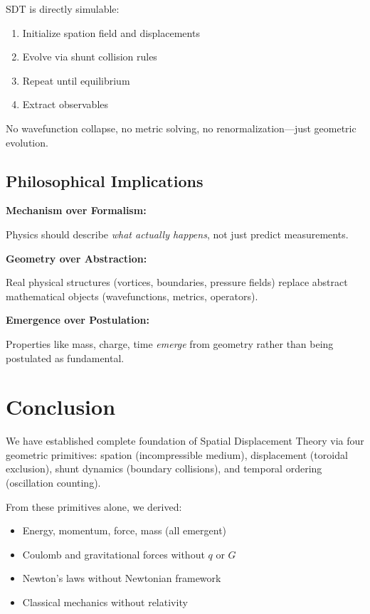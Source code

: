 SDT is directly simulable:

\begin{enumerate}
\item Initialize spation field and displacements
\item Evolve via shunt collision rules
\item Repeat until equilibrium
\item Extract observables
\end{enumerate}

No wavefunction collapse, no metric solving, no renormalization—just geometric evolution.

\subsection{Philosophical Implications}

\textbf{Mechanism over Formalism:}

Physics should describe \emph{what actually happens}, not just predict measurements.

\textbf{Geometry over Abstraction:}

Real physical structures (vortices, boundaries, pressure fields) replace abstract mathematical objects (wavefunctions, metrics, operators).

\textbf{Emergence over Postulation:}

Properties like mass, charge, time \emph{emerge} from geometry rather than being postulated as fundamental.

\section{Conclusion}

We have established complete foundation of Spatial Displacement Theory via four geometric primitives: spation (incompressible medium), displacement (toroidal exclusion), shunt dynamics (boundary collisions), and temporal ordering (oscillation counting).

From these primitives alone, we derived:

\begin{itemize}
\item Energy, momentum, force, mass (all emergent)
\item Coulomb and gravitational forces without $q$ or $G$
\item Newton's laws without Newtonian framework
\item Classical mechanics without relativity
\end{itemize}

